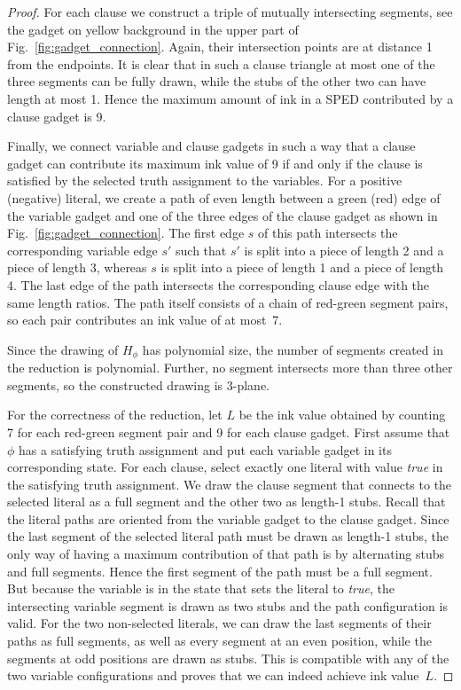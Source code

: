 \documentclass[a4paper,english,numberwithinsect]{eurocg18}
\begin{document}
\begin{proof}
	For each clause we construct a triple of mutually intersecting segments, see the gadget on yellow background in the upper part of Fig.~\ref{fig:gadget_connection}.
	Again, their intersection points are at distance 1 from the endpoints.
	It is clear that in such a clause triangle at most one of the three segments can be fully drawn, while the stubs of the other two can have length at most 1.
	Hence the maximum amount of ink in a SPED contributed by a clause gadget is 9.
	
	Finally, we connect variable and clause gadgets in such a way that a clause gadget can contribute its maximum ink value of 9 if and only if the clause is satisfied by the selected truth assignment to the variables.
	For a positive (negative) literal, we create a path of even length between a green (red) edge of the variable gadget and one of the three edges of the clause gadget as shown in Fig.~\ref{fig:gadget_connection}.
	The first edge $s$ of this path intersects the corresponding variable edge $s'$ such that $s'$ is split into a piece of length 2 and a piece of length 3, whereas $s$ is split into a piece of length 1 and a piece of length 4.
	The last edge of the path intersects the corresponding clause edge with the same length ratios.
	The path itself consists of a chain of red-green segment pairs, so each pair contributes an ink value of at most~7.
	
	Since the drawing of $H_\phi$ has polynomial size, the number of segments created in the reduction is polynomial. 
	Further, no segment intersects more than three other segments, so the constructed drawing is 3-plane. 

	For the correctness of the reduction, let $L$ be the ink value obtained by counting 7 for each red-green segment pair and 9 for each clause gadget. 
	First assume that $\phi$ has a satisfying truth assignment and put each variable gadget in its corresponding state.
	For each clause, select exactly one literal with value \emph{true} in the satisfying truth assignment. 
	We draw the clause segment that connects to the selected literal as a full segment and the other two as length-1 stubs.
	Recall that the literal paths are oriented from the variable gadget to the clause gadget.
	Since the last segment of the selected literal path must be drawn as length-1 stubs, the only way of having a maximum contribution of that path is by alternating stubs and full segments.
	Hence the first segment of the path must be a full segment.
	But because the variable is in the state that sets the literal to \emph{true}, the intersecting variable segment is drawn as two stubs and the path configuration is valid.
	For the two non-selected literals, we can draw the last segments of their paths as full segments, as well as every segment at an even position, while the segments at odd positions are drawn as stubs. 
	This is compatible with any of the two variable configurations and proves that we can indeed achieve ink value~$L$.
	

\end{proof}
\end{document}

